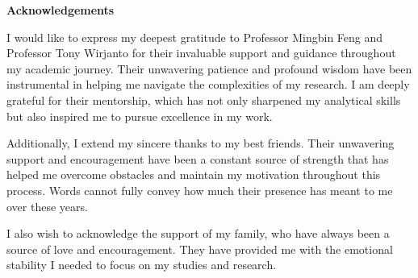 \cleardoublepage


\begin{center}\textbf{Acknowledgements}\end{center}

I would like to express my deepest gratitude to Professor Mingbin Feng and Professor Tony Wirjanto for their invaluable support and guidance throughout my academic journey. 
Their unwavering patience and profound wisdom have been instrumental in helping me navigate the complexities of my research. 
I am deeply grateful for their mentorship, which has not only sharpened my analytical skills but also inspired me to pursue excellence in my work.

Additionally, I extend my sincere thanks to my best friends.
Their unwavering support and encouragement have been a constant source of strength that has helped me overcome obstacles and maintain my motivation throughout this process. 
Words cannot fully convey how much their presence has meant to me over these years.

I also wish to acknowledge the support of my family, who have always been a source of love and encouragement.
They have provided me with the emotional stability I needed to focus on my studies and research.

\cleardoublepage

\renewcommand\contentsname{Table of Contents}
\tableofcontents
\cleardoublepage
{}    %

\listoftables
\cleardoublepage
{}		%

\listoffigures
\cleardoublepage
{}		%

\printglossaries
\cleardoublepage
{}		%


